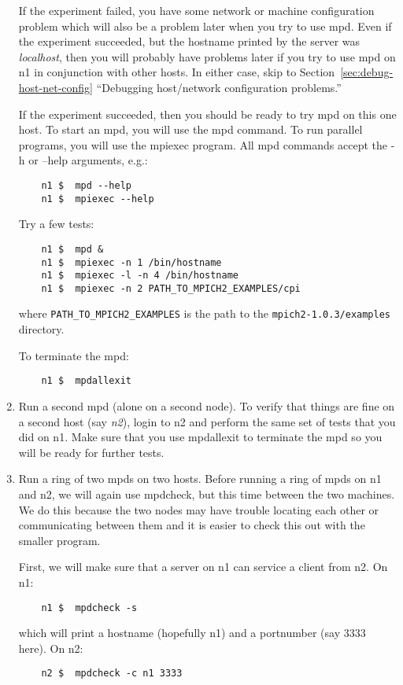 \documentclass[dvipdfm,11pt]{article}
\begin{document}
\begin{enumerate}
If the experiment failed, you have some network or machine configuration
problem which will also be a problem later when you try to use mpd.
Even if the experiment succeeded, but the hostname printed by the server
was \emph{localhost}, then you will probably have problems later if you
try to use mpd on n1 in conjunction with other hosts.  In either case,
skip to Section~\ref{sec:debug-host-net-config} ``Debugging host/network
configuration problems.'' 

If the experiment succeeded, then you should be ready to try mpd on
this one host. To start an mpd, you will use the mpd command.  To run
parallel programs, you will use the mpiexec program.  All mpd commands
accept the -h or --help arguments, e.g.:
\begin{verbatim}
    n1 $  mpd --help 
    n1 $  mpiexec --help
\end{verbatim}

Try a few tests:
\begin{verbatim}
    n1 $  mpd &
    n1 $  mpiexec -n 1 /bin/hostname
    n1 $  mpiexec -l -n 4 /bin/hostname
    n1 $  mpiexec -n 2 PATH_TO_MPICH2_EXAMPLES/cpi
\end{verbatim}
where \texttt{PATH\_TO\_MPICH2\_EXAMPLES} is the path to the
\texttt{mpich2-1.0.3/examples} directory.

To terminate the mpd:
\begin{verbatim}
    n1 $  mpdallexit
\end{verbatim}


\item Run a second mpd (alone on a second node).
To verify that things are fine on a second host (say \emph{n2}), login
to n2 and perform the same set of tests that you did on n1.  Make sure
that you use mpdallexit to terminate the mpd so you will be ready for
further tests.


\item Run a ring of two mpds on two hosts.
Before running a ring of mpds on n1 and n2, we will again use mpdcheck,
but this time between the two machines.  We do this because the two nodes
may have trouble locating each other or communicating between them and
it is easier to check this out with the smaller program.

First, we will make sure that a server on n1 can service a client from n2.
On n1:
\begin{verbatim}
    n1 $  mpdcheck -s
\end{verbatim}
which will print a hostname (hopefully n1) and a portnumber (say 3333 here).
On n2:
\begin{verbatim}
    n2 $  mpdcheck -c n1 3333
\end{verbatim}


\end{enumerate}
\end{document}
